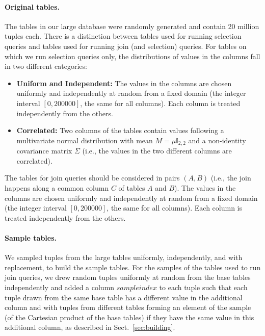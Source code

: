 \paragraph{Original tables.} The tables in our large database were randomly
generated and contain 20 million tuples each. There is a distinction between tables
used for running selection queries and tables used for running join (and
selection) queries. For tables on which we run selection queries only, the
distributions of values in the columns fall in two different categories:  
\begin{itemize}
  \item {\bf Uniform and Independent:} The values in the columns are chosen
    uniformly and independently at random from a fixed domain (the integer
    interval $[0,200000]$, the same for all columns). Each column is treated
    independently from the others. 
  \item {\bf Correlated:} Two columns of the tables contain values following a
    multivariate normal distribution with mean $M=\mu\mathbb{I}_{2,2}$ and a
    non-identity covariance matrix $\Sigma$ (i.e., the values in the two
    different columns are correlated). 
\end{itemize}
The tables for join queries should be considered in pairs $(A,B)$ (i.e., the
join happens along a common column $C$ of tables $A$ and $B$). The values in the
columns are chosen uniformly and independently at random from a fixed domain (the integer interval
$[0,200000]$, the same for all columns). Each column is treated independently
from the others. 

\paragraph{Sample tables.} We sampled tuples from the large tables uniformly,
independently, and with replacement, to build the sample tables. For the samples
of the tables used to run join queries, we drew random tuples uniformly at
random from the base tables independently and added a column $sampleindex$ to
each tuple such that each tuple drawn from the same base table has a different
value in the additional column and with tuples from different tables forming an
element of the sample (of the Cartesian product of the base tables) if they have
the same value in this additional column, as described in
Sect.~\ref{sec:building}.

